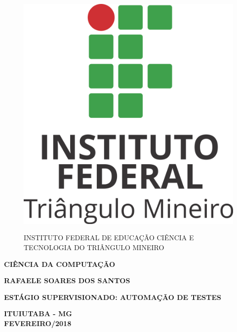 \thispagestyle{empty}

\begin{figure}
\begin{minipage}{2 cm}
\includegraphics[width=2 cm,height=2 cm]{Imagens/LogoVertical.png}
\end{minipage}
\hfill
\begin{minipage}{14 cm}
INSTITUTO FEDERAL DE EDUCAÇÃO CIÊNCIA E TECNOLOGIA DO TRIÂNGULO MINEIRO
\end{minipage}
\end{figure}

\begin{center}
\textbf{CIÊNCIA DA COMPUTAÇÃO}

\vspace*{4 cm}

\textbf{RAFAELE SOARES DOS SANTOS}

\vspace*{7 cm}

\textbf{\large{ESTÁGIO SUPERVISIONADO: AUTOMAÇÃO DE TESTES}}

\vspace*{7 cm}

\textbf{ITUIUTABA - MG\\
FEVEREIRO/2018}
\end{center}
